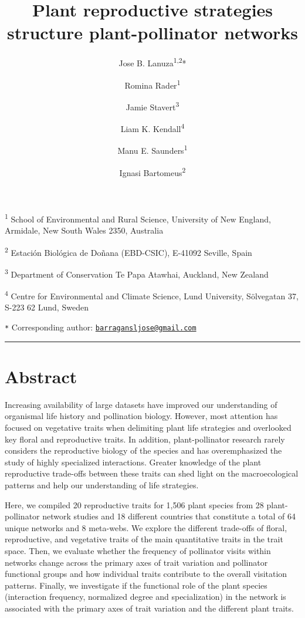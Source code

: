 \documentclass[11pt,a4paper,]{article}
\title{Plant reproductive strategies structure plant-pollinator networks}
\author{Jose B. Lanuza\textsuperscript{1,2}* \and Romina Rader\textsuperscript{1} \and Jamie Stavert\textsuperscript{3} \and Liam K. Kendall\textsuperscript{4} \and Manu E. Saunders\textsuperscript{1} \and Ignasi Bartomeus\textsuperscript{2}}
\date{}
\begin{document}
\maketitle

\small

\textsuperscript{1} School of Environmental and Rural Science,
University of New England, Armidale, New South Wales 2350, Australia

\textsuperscript{2} Estación Biológica de Doñana (EBD-CSIC), E-41092
Seville, Spain

\textsuperscript{3} Department of Conservation \textbar{} Te Papa
Atawhai, Auckland, New Zealand

\textsuperscript{4} Centre for Environmental and Climate Science, Lund
University, Sölvegatan 37, S-223 62 Lund, Sweden

\texttt{*} Corresponding author:
\href{mailto:barragansljose@gmail.com}{\nolinkurl{barragansljose@gmail.com}}

\normalsize

\vspace{1cm} \hrule

\section{Abstract}\label{abstract}

Increasing availability of large datasets have improved our
understanding of organismal life history and pollination biology.
However, most attention has focused on vegetative traits when delimiting
plant life strategies and overlooked key floral and reproductive traits.
In addition, plant-pollinator research rarely considers the reproductive
biology of the species and has overemphasized the study of highly
specialized interactions. Greater knowledge of the plant reproductive
trade-offs between these traits can shed light on the macroecological
patterns and help our understanding of life strategies.

Here, we compiled 20 reproductive traits for 1,506 plant species from 28
plant-pollinator network studies and 18 different countries that
constitute a total of 64 unique networks and 8 meta-webs. We explore the
different trade-offs of floral, reproductive, and vegetative traits of
the main quantitative traits in the trait space. Then, we evaluate
whether the frequency of pollinator visits within networks change across
the primary axes of trait variation and pollinator functional groups and
how individual traits contribute to the overall visitation patterns.
Finally, we investigate if the functional role of the plant species
(interaction frequency, normalized degree and specialization) in the
network is associated with the primary axes of trait variation and the
different plant traits.
\end{document}
